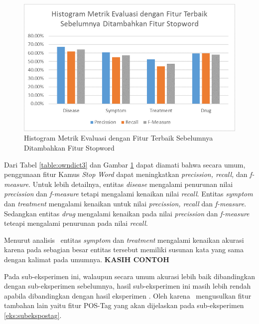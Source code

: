 	\begin{figure}
		\centering
		\includegraphics[width=0.85\linewidth]{images/histogram3}
		\caption{Histogram Metrik Evaluasi dengan Fitur Terbaik Sebelumnya Ditambahkan Fitur Stopword}
		\label{fig:owndict3}
	\end{figure}
	
	Dari Tabel \ref{table:owndict3} dan Gambar \ref{fig:owndict3} dapat diamati bahwa secara umum, penggunaan fitur Kamus \textit{Stop Word} dapat meningkatkan \textit{precission, recall,} dan \textit{f-measure}. Untuk lebih detailnya, entitas \textit{disease} mengalami penurunan nilai \textit{precission} dan \textit{f-measure} tetapi mengalami kenaikan nilai \textit{recall}. Entitas \textit{symptom} dan \textit{treatment} mengalami kenaikan untuk nilai \textit{precission, recall} dan \textit{f-measure}. Sedangkan entitas \textit{drug} mengalami kenaikan pada nilai \textit{precission} dan \textit{f-measure} teteapi mengalami penurunan pada nilai \textit{recall}.
	
	Menurut analisis \saya~entitas \textit{symptom} dan \textit{treatment} mengalami kenaikan akurasi karena pada sebagian besar entitas tersebut memiliki susunan kata yang sama dengan kalimat pada umumnya. \textbf{KASIH CONTOH}
	
	Pada sub-eksperimen ini, walaupun secara umum akurasi lebih baik dibandingkan dengan sub-eksperimen sebelumnya, hasil sub-eksperimen ini masih lebih rendah apabila dibandingkan dengan hasil eksperimen \cite{skripsiKakRadit}. Oleh karena \saya~mengusulkan fitur tambahan lain yaitu fitur POS-Tag yang akan dijelaskan pada sub-eksperimen \ref{eks:subekspostag}.
	
